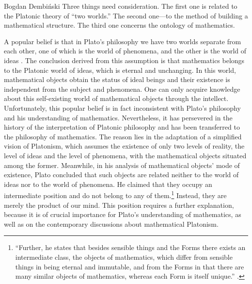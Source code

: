 \begin{artengenv}{Bogdan Dembiński}
Three things need consideration. The first one is related to the Platonic theory of ``two
worlds.'' The second one---to the method of building a mathematical structure. The third one
concerns the ontology of mathematics.

A popular belief is that in Plato’s philosophy we have two worlds separate from each other, one of which is the world
of phenomena, and the other is the world of ideas
\parencite{dembinski_streit_2007}.
The conclusion derived
from this assumption is that mathematics belongs to the Platonic world of ideas, which is eternal and unchanging. In
this world, mathematical objects obtain the status of ideal beings and their existence is independent from the
subject and phenomena. One can only acquire knowledge about this self-existing world of mathematical objects through
the intellect. Unfortunately, this popular belief is in fact inconsistent with Plato’s philosophy and his understanding
of mathematics. Nevertheless, it has persevered in the history of the interpretation of Platonic philosophy and
has been transferred to the philosophy of mathematics. The reason lies in the adaptation of a simplified
vision of Platonism, which assumes the existence of only two levels of reality, the level of ideas and the level of
phenomena, with the mathematical objects situated among the former. Meanwhile, in his analysis of mathematical objects'
mode of existence, Plato concluded that such objects are related neither to the world of ideas nor to the world of
phenomena. He claimed that they occupy an intermediate position and do not belong to any of
them.\footnote{``Further, he states that besides sensible things and the Forms there exists an intermediate class,
the objects of mathematics, which differ from sensible things in being eternal and immutable,
and from the Forms in that there
are many similar objects of mathematics, whereas each Form is itself unique.''
\parencite[987b]{aristotle_aristotles_1924}.
}
Instead, they are merely the product of our mind. This position requires a further explanation, because it is of
crucial importance for Plato’s understanding of mathematics, as well as on the contemporary discussions about
mathematical Platonism.


\end{artengenv}
